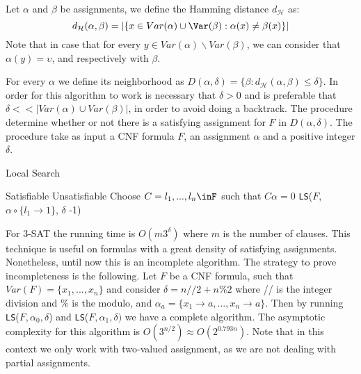 \begin{definition}
  Let $\alpha$ and $\beta$ be assignments, we define the Hamming distance $d_\mathcal{H}$ as:
  $$d_\mathcal{H}(\alpha,\beta) =  |\{ x \in Var(\alpha) \cup \Var(\beta) : \alpha(x) \ne \beta(x) \} |$$
  Note that in case that for every $y \in Var(\alpha) \backslash Var(\beta)$, we can  consider that $\alpha(y) = \upsilon$, and respectively with $\beta$.
\end{definition}

For every $\alpha$ we define its neighborhood as $D(\alpha,\delta) = \{\beta : d_\mathcal{H}(\alpha,\beta) \le \delta\}$. In order for this algorithm to work is necessary that $\delta > 0$ and is preferable that $\delta << |Var(\alpha) \cup Var(\beta)|$, in order to avoid doing a backtrack. The procedure determine whether or not there is a satisfying assignment for $F$ in $D(\alpha,\delta)$. The procedure take as input a CNF formula $F$, an assignment $\alpha$ and a positive integer $\delta$.

\begin{algorithm}
  \caption{Local Search\cite{schoning2013satisfiability}}\label{ds}
  \begin{algorithmic}[1]
     \Return Satisfiable
    \EndIf
     \Return Unsatisfiable 
    \EndIf
    \State Choose $C={l_1,...,l_n}\inF$ such that $C\alpha=0$
  \State \Return \texttt{LS}($F$, $\alpha\circ\{l_1 \to 1\}$, $\delta$ -1)
  \EndFor
\end{algorithmic}
\end{algorithm}


For 3-SAT the running time is $O(m3^\delta)$ where $m$ is the number of clauses. This technique is useful on formulas with a great density of satisfying assignments. Nonetheless, until now this is an incomplete algorithm. The strategy to prove incompleteness is the following. Let $F$ be a CNF formula, such that $Var(F)=\{x_1,...,x_n\}$ and consider $\delta = n//2+n\%2$ where // is the integer division and \% is the modulo, and $\alpha_a = \{x_1 \to a,...,x_n\to a\}$. Then by running \texttt{LS}($F,\alpha_0,\delta$) and \texttt{LS}($F,\alpha_1,\delta)$ we have a complete algorithm. The asymptotic complexity for this algorithm is $O(3^{n/2}) \approx O(2^{0.793n})$. Note that in this context we only work with two-valued assignment, as we are not dealing with partial assignments.\\

